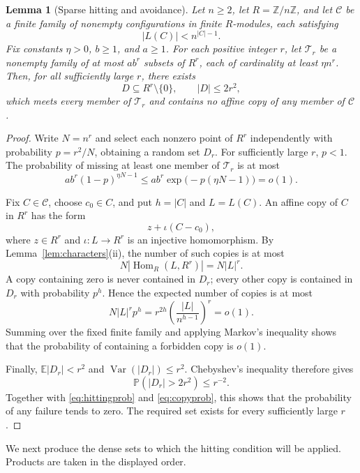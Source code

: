 \documentclass[11pt,reqno]{amsart}
\newtheorem{lemma}[theorem]{Lemma}
\theoremstyle{definition}
\numberwithin{equation}{section}
\newcommand{\Hom}{\operatorname{Hom}}
\newcommand{\Z}{\mathbb{Z}}
\newcommand{\E}{\mathbb{E}}
\newcommand{\Prb}{\mathbb{P}}
\newcommand{\calC}{\mathcal{C}}
\renewcommand{\leq}{\leqslant}
\renewcommand{\geq}{\geqslant}
\begin{document}
\begin{lemma}[Sparse hitting and avoidance]\label{lem:sparse}
Let $n\geq 2$, let $R=\Z/n\Z$, and let $\calC$ be a finite family of nonempty configurations in finite $R$-modules, each satisfying
\[
 |L(C)|<n^{|C|-1}.
\]
Fix constants $\eta>0$, $b\geq 1$, and $a\geq 1$. For each positive integer $r$, let $\mathcal{T}_r$ be a nonempty family of at most $ab^r$ subsets of $R^r$, each of cardinality at least $\eta n^r$. Then, for all sufficiently large $r$, there exists
\[
 D\subseteq R^r\setminus\{0\},\qquad |D|\leq 2r^2,
\]
which meets every member of $\mathcal{T}_r$ and contains no affine copy of any member of $\calC$.
\end{lemma}
\begin{proof}
Write $N=n^r$ and select each nonzero point of $R^r$ independently with probability $p=r^2/N$, obtaining a random set $D_r$. For sufficiently large $r$, $p<1$. The probability of missing at least one member of $\mathcal{T}_r$ is at most
\begin{equation}\label{eq:hittingprob}
 ab^r(1-p)^{\eta N-1}
 \leq ab^r\exp\bigl(-p(\eta N-1)\bigr)=o(1).
\end{equation}

Fix $C\in\calC$, choose $c_0\in C$, and put $h=|C|$ and $L=L(C)$. An affine copy of $C$ in $R^r$ has the form
\[
 z+\iota(C-c_0),
\]
where $z\in R^r$ and $\iota:L\to R^r$ is an injective homomorphism. By Lemma~\ref{lem:characters}(ii), the number of such copies is at most
\[
 N|\Hom_R(L,R^r)|=N|L|^r.
\]
A copy containing zero is never contained in $D_r$; every other copy is contained in $D_r$ with probability $p^h$. Hence the expected number of copies is at most
\begin{equation}\label{eq:copyprob}
 N|L|^r p^h
 =r^{2h}\left(\frac{|L|}{n^{h-1}}\right)^r=o(1).
\end{equation}
Summing over the fixed finite family and applying Markov's inequality shows that the probability of containing a forbidden copy is $o(1)$.

Finally, $\E|D_r|<r^2$ and $\operatorname{Var}(|D_r|)\leq r^2$. Chebyshev's inequality therefore gives
\[
 \Prb(|D_r|>2r^2)\leq r^{-2}.
\]
Together with \eqref{eq:hittingprob} and \eqref{eq:copyprob}, this shows that the probability of any failure tends to zero. The required set exists for every sufficiently large $r$.
\end{proof}

We next produce the dense sets to which the hitting condition will be applied. Products are taken in the displayed order.
\end{document}
